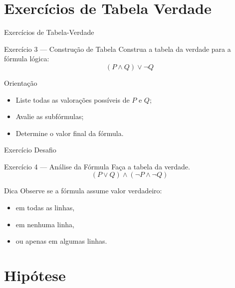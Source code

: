 \documentclass[9pt]{beamer}
\begin{document}
\section{Exercícios de Tabela Verdade}
\begin{frame}{Exercícios de Tabela-Verdade}
\Large

\begin{block}{Exercício 3 — Construção de Tabela}
Construa a tabela da verdade para a fórmula lógica:
\[
(P \land Q) \lor \neg Q
\]
\end{block}

\begin{block}{Orientação}
\begin{itemize}
    \item Liste todas as valorações possíveis de $P$ e $Q$;
    \item Avalie as subfórmulas;
    \item Determine o valor final da fórmula.
\end{itemize}
\end{block}

\end{frame}
\begin{frame}{Exercício Desafio}
\Large

\begin{block}{Exercício 4 — Análise da Fórmula}
Faça a tabela da verdade.
\[
(P \lor Q) \land (\neg P \land \neg Q)
\]
\end{block}

\begin{block}{Dica}
Observe se a fórmula assume valor verdadeiro:
\begin{itemize}
    \item em todas as linhas,
    \item em nenhuma linha,
    \item ou apenas em algumas linhas.
\end{itemize}
\end{block}

\end{frame}
\section{Hipótese}
\end{document}
